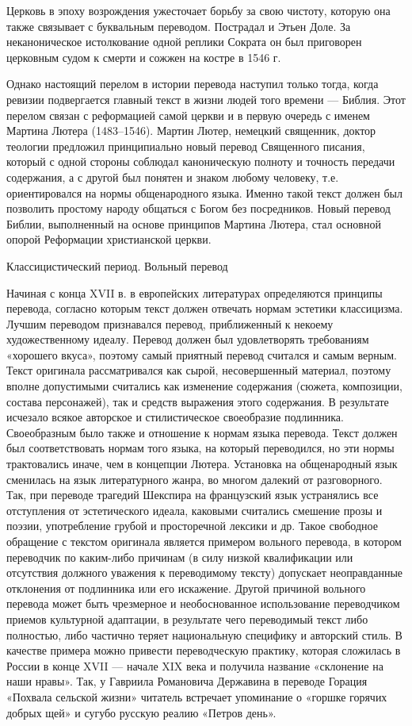 Церковь в эпоху возрождения ужесточает борьбу за свою чистоту, которую она также связывает с буквальным переводом. Пострадал и Этьен Доле. За неканоническое истолкование одной реплики Сократа он был приговорен церковным судом к смерти и сожжен на костре в 1546 г.

Однако настоящий перелом в истории перевода наступил только тогда, когда ревизии подвергается главный текст в жизни людей того времени --- Библия. Этот перелом связан с реформацией самой церкви и в первую очередь с именем Мартина Лютера (1483--1546). Мартин Лютер, немецкий священник, доктор теологии предложил принципиально новый перевод Священного писания, который с одной стороны соблюдал каноническую полноту и точность передачи содержания, а с другой был понятен и знаком любому человеку, т.е. ориентировался на нормы общенародного языка. Именно такой текст должен был позволить простому народу общаться с Богом без посредников. Новый перевод Библии, выполненный на основе принципов Мартина Лютера, стал основной опорой Реформации христианской церкви.

Классицистический период. Вольный перевод

Начиная с конца XVII в. в европейских литературах определяются принципы перевода, согласно которым текст должен отвечать нормам эстетики классицизма. Лучшим переводом признавался перевод, приближенный к некоему художественному идеалу. Перевод должен был удовлетворять требованиям «хорошего вкуса», поэтому самый приятный перевод считался и самым верным. Текст оригинала рассматривался как сырой, несовершенный материал, поэтому вполне допустимыми считались как изменение содержания (сюжета, композиции, состава персонажей), так и средств выражения этого содержания. В результате исчезало всякое авторское и стилистическое своеобразие подлинника. Своеобразным было также и отношение к нормам языка перевода. Текст должен был соответствовать нормам того языка, на который переводился, но эти нормы трактовались иначе, чем в концепции Лютера. Установка на общенародный язык сменилась на язык литературного жанра, во многом далекий от разговорного. Так, при переводе трагедий Шекспира на французский язык устранялись все отступления от эстетического идеала, каковыми считались смешение прозы и поэзии, употребление грубой и просторечной лексики и др. Такое свободное обращение с текстом оригинала является примером вольного перевода, в котором переводчик по каким-либо причинам (в силу низкой квалификации или отсутствия должного уважения к переводимому тексту) допускает неоправданные отклонения от подлинника или его искажение. Другой причиной вольного перевода может быть чрезмерное и необоснованное использование переводчиком приемов культурной адаптации, в результате чего переводимый текст либо полностью, либо частично теряет национальную специфику и авторский стиль. В качестве примера можно привести переводческую практику, которая сложилась в России в конце XVII --- начале XIX века и получила название «склонение на наши нравы». Так, у Гавриила Романовича Державина в переводе Горация «Похвала сельской жизни» читатель встречает упоминание о «горшке горячих добрых щей» и сугубо русскую реалию «Петров день».

